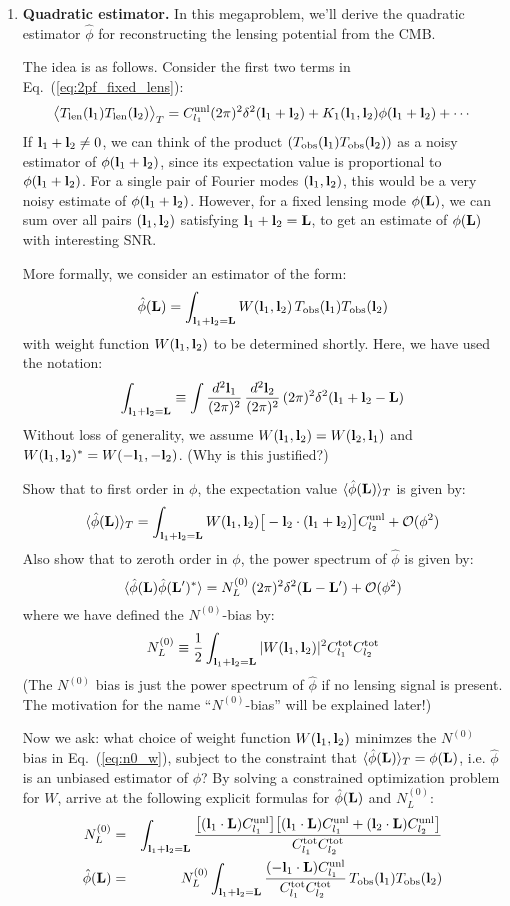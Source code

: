 \documentclass[aps,prd,superscriptaddress,groupedaddress,nofootinbib,nobibnotes]{revtex4}
\newcommand{\be}{\begin{equation}}
\newcommand{\ee}{\end{equation}}
\newcommand{\ba}{\begin{eqnarray}}
\newcommand{\ea}{\end{eqnarray}}
\newcommand{\bigoh}{\mathcal{O}}
\def\l{{\bf l}}
\def\L{{\bf L}}
\def\hphi{{\hat\phi}}
\begin{document}
\begin{enumerate}
\item {\bf Quadratic estimator.}
In this megaproblem, we'll derive the quadratic estimator $\hphi$ for reconstructing the lensing potential from the CMB.

The idea is as follows.  Consider the first two terms in Eq.~(\ref{eq:2pf_fixed_lens}):
\be
\big\langle T_{\rm len}(\l_1) T_{\rm len}(\l_2) \big\rangle_T = C_{l_1}^{\rm unl} (2\pi)^2 \delta^2(\l_1+\l_2) + K_1(\l_1,\l_2) \phi(\l_1+\l_2) + \cdots
\ee
If $\l_1+\l_2 \ne 0$, we can think of the product $(T_{\rm obs}(\l_1) T_{\rm obs}(\l_2))$ as a noisy estimator
of $\phi(\l_1+\l_2)$, since its expectation value is proportional to $\phi(\l_1+\l_2)$.  For a single pair of
Fourier modes $(\l_1,\l_2)$, this would be a very noisy estimate of $\phi(\l_1+\l_2)$.  However, for a fixed
lensing mode $\phi(\L)$, we can sum over all pairs $(\l_1,\l_2)$ satisfying $\l_1+\l_2=\L$, to get an estimate
of $\phi(\L)$ with interesting SNR.

More formally, we consider an estimator of the form:
\be
\hphi(\L) = \int_{\l_1+\l_2=\L} W(\l_1,\l_2) \, T_{\rm obs}(\l_1) T_{\rm obs}(\l_2)
\ee
with weight function $W(\l_1,\l_2)$ to be determined shortly.
Here, we have used the notation:
\be
\int_{\l_1+\l_2 = \L} \equiv \int \frac{d^2\l_1}{(2\pi)^2} \, \frac{d^2\l_2}{(2\pi)^2} \, (2\pi)^2 \delta^2(\l_1+\l_2-\L)
\ee
Without loss of generality, we assume $W(\l_1,\l_2) = W(\l_2,\l_1)$ and $W(\l_1,\l_2)^* = W(-\l_1,-\l_2)$.  (Why is this justified?)

Show that to first order in $\phi$, the expectation value $\langle \hphi(\L) \rangle_T$ is given by:
\be
\langle \hphi(\L) \rangle_T = \int_{\l_1+\l_2=\L} W(\l_1,\l_2) \big[ -\l_2\cdot(\l_1+\l_2) \big] C_{l_2}^{\rm unl} + \bigoh(\phi^2)
\ee
Also show that to zeroth order in $\phi$, the power spectrum of $\hphi$ is given by:
\be
\langle \hphi(\L) \hphi(\L')^* \rangle = N_L^{(0)} \, (2\pi)^2 \delta^2(\L-\L') + \bigoh(\phi^2)
\ee
where we have defined the $N^{(0)}$-bias by:
\be
N_L^{(0)} \equiv \frac{1}{2} \int_{\l_1+\l_2=\L} |W(\l_1,\l_2)|^2 C_{l_1}^{\rm tot} C_{l_2}^{\rm tot}  \label{eq:n0_w}
\ee
(The $N^{(0)}$ bias is just the power spectrum of $\hphi$ if no lensing signal is present.
The motivation for the name ``$N^{(0)}$-bias'' will be explained later!)

Now we ask: what choice of weight function $W(\l_1,\l_2)$ minimzes the $N^{(0)}$ bias in Eq.~(\ref{eq:n0_w}),
subject to the constraint that $\langle \hphi(\L) \rangle_T = \phi(\L)$, i.e. $\hphi$ is an unbiased estimator of $\phi$?
By solving a constrained optimization problem for $W$, arrive at the following explicit formulas
for $\hphi(\L)$ and $N_L^{(0)}$:
\ba
N_L^{(0)} &=& \int_{\l_1+\l_2=\L} \frac{
  \big[ ( \l_1\cdot \L ) C_{l_1}^{\rm unl} \big]
  \big[ ( \l_1\cdot \L ) C_{l_1}^{\rm unl} + ( \l_2\cdot \L ) C_{l_2}^{\rm unl} \big]}{C_{l_1}^{\rm tot} C_{l_2}^{\rm tot}}  \label{eq:n0_fourier} \\
\hphi(\L) &=& N_L^{(0)} \int_{\l_1+\l_2=\L} \frac{(-\l_1\cdot \L) C_{l_1}^{\rm unl}}{C_{l_1}^{\rm tot} C_{l_2}^{\rm tot}}
  \, T_{\rm obs}(\l_1) T_{\rm obs}(\l_2)  \label{eq:hphi_fourier}
\ea


\end{enumerate}
\end{document}
